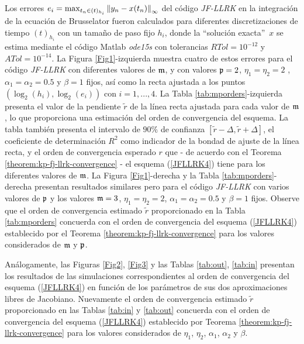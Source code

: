 \vspace{0.5cm}

Los errores $e_i=\max_{t_n\in(t)_{h_i}}\left\lVert y_n-x(t_n) \right\rVert_\infty$ del código \textit{JF-LLRK} en la integración de la ecuación de Brusselator fueron calculados para diferentes discretizaciones de tiempo $(t)_{h_i}$ con un tamaño de paso fijo $h_i$, donde la \textquotedblleft solución exacta\textquotedblright ~$x$ se estima mediante el código Matlab \textit{ode15s} con tolerancias $RTol= 10^{-12}$ y $ATol=10^{-14}$. La Figura \ref{Fig1}-izquierda muestra cuatro de estos errores para el código \textit{JF-LLRK} con diferentes valores de $\mathfrak{m}$, y con valores $\mathfrak{p}=2$, $\eta_1=\eta_2=2$ , $\alpha_1=\alpha_2=0\mathord{.}5$ y $\beta=1$ fijos, así como la recta ajustada a los puntos $(\log_2(h_i),\log_2(e_i))$ con $i=1,. ..,4$. La Tabla \ref{tab:mporders}-izquierda presenta el valor de la pendiente $\widetilde{r}$ de la línea recta ajustada para cada valor de $\mathfrak{m}$, lo que proporciona una estimación del orden de convergencia del esquema. La tabla también presenta el intervalo de $90\%$ de confianza $[\widetilde{r}-\varDelta,\widetilde{r}+\varDelta]$, el coeficiente de determinación $R^2$ como indicador de la bondad de ajuste de la línea recta, y el orden de convergencia esperado $r$ que - de acuerdo con el Teorema \ref {theorem:kp-fj-llrk-convergence} - el esquema (\ref{JFLLRK4}) tiene para los diferentes valores de $\mathfrak{m}$. La Figura \ref{Fig1}-derecha y la Tabla \ref{tab:mporders}-derecha presentan resultados similares pero para el código \textit{JF-LLRK} con varios valores de $\mathfrak{p}$ y los valores $\mathfrak{m}=3$, $\eta_1=\eta_2=2$, $\alpha_1=\alpha_2=0\mathord{.}5$ y $\beta=1$ fijos. Observe que el orden de convergencia estimado $\widetilde{r}$ proporcionado en la Tabla \ref{tab:mporders} concuerda con el orden de convergencia del esquema (\ref{JFLLRK4}) establecido por el Teorema \ref{theorem:kp-fj-llrk-convergence} para los valores considerados de $\mathfrak{m}$ y $\mathfrak{p}$.

Análogamente, las Figuras \ref{Fig2}, \ref{Fig3} y las Tablas \ref{tab:out}, \ref{tab:in} presentan los resultados de las simulaciones correspondientes al orden de convergencia del esquema (\ref{JFLLRK4}) en función de los parámetros de sus dos aproximaciones libres de Jacobiano. Nuevamente el orden de convergencia estimado $\widetilde{r}$ proporcionado en las Tablas \ref{tab:in} y \ref{tab:out} concuerda con el orden de convergencia del esquema (\ref{JFLLRK4}) establecido por Teorema \ref{theorem:kp-fj-llrk-convergence} para los valores considerados de $\eta_1$, $\eta_2$, $\alpha_1$, $\alpha_2$ y $\beta$.

